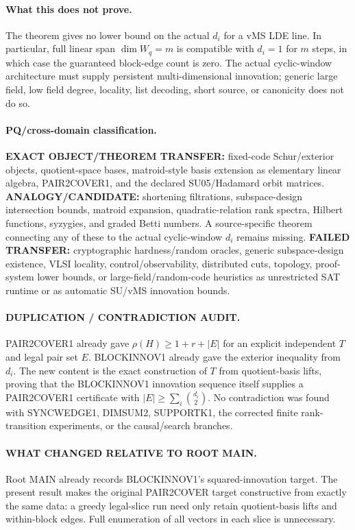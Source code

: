\documentclass[11pt]{article}
\begin{document}
\paragraph{What this does not prove.}
The theorem gives no lower bound on the actual $d_i$ for a vMS LDE line. In particular, full linear span $\dim W_q=m$ is compatible with $d_i=1$ for $m$ steps, in which case the guaranteed block-edge count is zero. The actual cyclic-window architecture must supply persistent multi-dimensional innovation; generic large field, low field degree, locality, list decoding, short source, or canonicity does not do so.

\paragraph{PQ/cross-domain classification.}
\textbf{EXACT OBJECT/THEOREM TRANSFER:} fixed-code Schur/exterior objects, quotient-space bases, matroid-style basis extension as elementary linear algebra, PAIR2COVER1, and the declared SU05/Hadamard orbit matrices.
\textbf{ANALOGY/CANDIDATE:} shortening filtrations, subspace-design intersection bounds, matroid expansion, quadratic-relation rank spectra, Hilbert functions, syzygies, and graded Betti numbers. A source-specific theorem connecting any of these to the actual cyclic-window $d_i$ remains missing.
\textbf{FAILED TRANSFER:} cryptographic hardness/random oracles, generic subspace-design existence, VLSI locality, control/observability, distributed cuts, topology, proof-system lower bounds, or large-field/random-code heuristics as unrestricted SAT runtime or as automatic SU/vMS innovation bounds.

\paragraph{DUPLICATION / CONTRADICTION AUDIT.}
PAIR2COVER1 already gave $\rho(H)\ge1+r+|E|$ for an explicit independent $T$ and legal pair set $E$. BLOCKINNOV1 already gave the exterior inequality from $d_i$. The new content is the exact construction of $T$ from quotient-basis lifts, proving that the BLOCKINNOV1 innovation sequence itself supplies a PAIR2COVER1 certificate with $|E|\ge\sum_i\binom{d_i}{2}$. No contradiction was found with SYNCWEDGE1, DIMSUM2, SUPPORTK1, the corrected finite rank-transition experiments, or the causal/search branches.

\paragraph{WHAT CHANGED RELATIVE TO ROOT MAIN.}
Root MAIN already records BLOCKINNOV1's squared-innovation target. The present result makes the original PAIR2COVER target constructive from exactly the same data: a greedy legal-slice run need only retain quotient-basis lifts and within-block edges. Full enumeration of all vectors in each slice is unnecessary.
\end{document}
